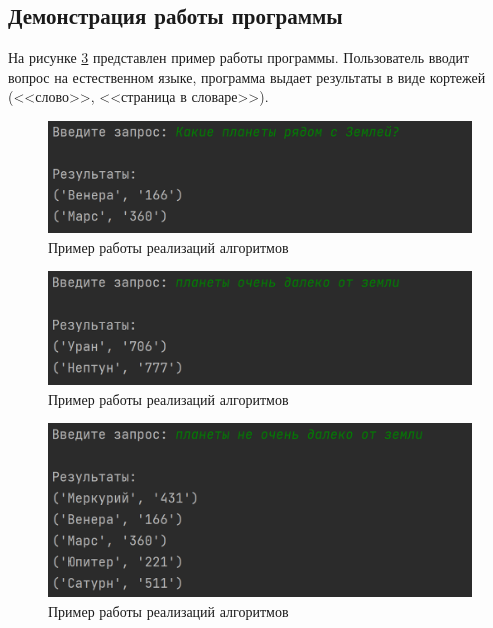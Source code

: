 \subsection{Демонстрация работы программы}
\vspace{\baselineskip}

На рисунке \ref{fig:output} представлен пример работы программы.
Пользователь вводит вопрос на естественном языке, программа выдает результаты в виде кортежей (<<слово>>, <<страница в словаре>>).

\begin{figure}[h!btp]
	\centering
	\includegraphics[width=420pt]{inc/output1.png}
	\caption{Пример работы реализаций алгоритмов}
	\label{fig:output}	
\end{figure}

\begin{figure}[h!btp]
	\centering
	\includegraphics[width=420pt]{inc/output2.png}
	\caption{Пример работы реализаций алгоритмов}
	\label{fig:output}	
\end{figure}

\begin{figure}[h!btp]
	\centering
	\includegraphics[width=420pt]{inc/output3.png}
	\caption{Пример работы реализаций алгоритмов}
	\label{fig:output}	
\end{figure}

